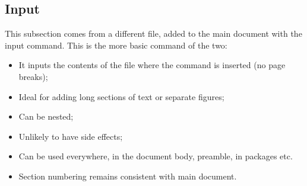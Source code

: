 \subsection{Input}
This subsection comes from a different file, added to the main document with 
the input command. This is the more basic command of the two:

\begin{itemize}
	\item It inputs the contents of the file where the command is inserted (no 
	page breaks);
	\item Ideal for adding long sections of text or separate figures;
	\item Can be nested;
	\item Unlikely to have side effects;
	\item Can be used everywhere, in the document body, preamble, in 
	packages etc.
	\item Section numbering remains consistent with main document.
\end{itemize}